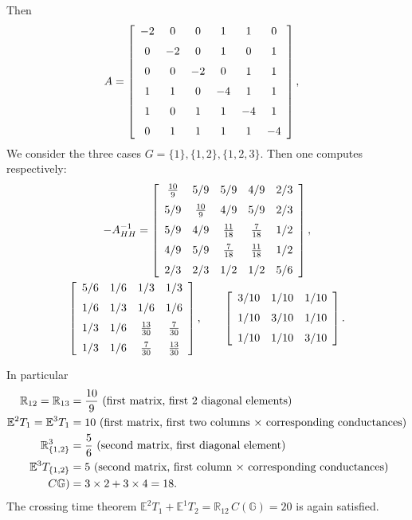 \documentclass[a4paper]{amsart}
\theoremstyle{plain}
\theoremstyle{definition}
\theoremstyle{remark}
\begin{document}
Then
\begin{equation} \label{ASG2}
A =  \left[ \begin {array}{cccccc} -2&0&0&1&1&0\\\noalign{\medskip}0&-2&0&
1&0&1\\\noalign{\medskip}0&0&-2&0&1&1\\\noalign{\medskip}1&1&0&-4&1&1
\\\noalign{\medskip}1&0&1&1&-4&1\\\noalign{\medskip}0&1&1&1&1&-4
\end {array} \right] ,
\quad 
\end{equation} 
We consider the three cases $G = \{1\}, \{1,2\}, \{1,2,3\} $. Then one computes respectively:
\begin{equation} \label{3ahh}
\begin{gathered} 
-A_{HH}^{-1} = 
 \left[ \begin {array}{ccccc} {\frac {10}{9}}&5/9&5/9&4/9&2/3
\\\noalign{\medskip}5/9&{\frac {10}{9}}&4/9&5/9&2/3
\\\noalign{\medskip}5/9&4/9&{\frac {11}{18}}&{\frac {7}{18}}&1/2
\\\noalign{\medskip}4/9&5/9&{\frac {7}{18}}&{\frac {11}{18}}&1/2
\\\noalign{\medskip}2/3&2/3&1/2&1/2&5/6\end {array} \right], \\
 \left[ \begin {array}{cccc} 5/6&1/6&1/3&1/3\\\noalign{\medskip}1/6&1/
3&1/6&1/6\\\noalign{\medskip}1/3&1/6&{\frac {13}{30}}&{\frac {7}{30}}
\\\noalign{\medskip}1/3&1/6&{\frac {7}{30}}&{\frac {13}{30}}
\end {array} \right] ,
\qquad 
 \left[ \begin {array}{ccc} 3/10&1/10&1/10\\\noalign{\medskip}1/10&3/
10&1/10\\\noalign{\medskip}1/10&1/10&3/10\end {array} \right] .
\end{gathered}
\end{equation} 

In particular
\begin{align*}
\mathbb{R}_{12}  = \mathbb{R}_{13}    & = 
                                      \frac{10}{9}  \text{ (first matrix, first 2 diagonal elements)}\\
\mathbb{E}^2T_1 = \mathbb{E}^3T_1 &=  10 \text{ (first matrix, first two columns  $ \times $ corresponding conductances)}\\
\mathbb{R}^3_{\{1,2\}}    &=  \frac{5}{6}   \text{ (second matrix, first  diagonal element)}\\
\mathbb{E}^3 T_{ \{1,2\}} &      = 5 \text{ (second matrix, first column   $ \times $ corresponding conductances)}\\
C\mathbb{G} ) &=   3 \times 2 + 3\times 4  = 18.
\end{align*} 
The crossing time theorem  $ \mathbb{E}^2T_1 +  \mathbb{E}^1T_2 = \mathbb{R}_{12}\, C( \mathbb{G} ) = 20$ is again satisfied.
\end{document}
